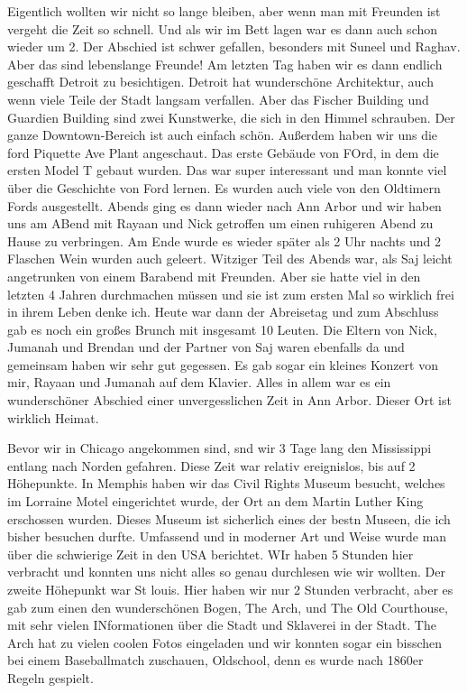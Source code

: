 \documentclass[11pt]{book}
\begin{document}
Eigentlich wollten wir nicht so lange bleiben, aber wenn man mit Freunden ist vergeht die Zeit so schnell. Und als wir im Bett lagen war es dann auch schon wieder 
um 2. Der Abschied ist schwer gefallen, besonders mit Suneel und Raghav. Aber das sind lebenslange Freunde! 
Am letzten Tag haben wir es dann endlich geschafft Detroit zu besichtigen. Detroit hat wunderschöne Architektur, auch wenn viele Teile der Stadt langsam verfallen. 
Aber das Fischer Building und Guardien Building sind zwei Kunstwerke, die sich in den Himmel schrauben. Der ganze Downtown-Bereich ist auch einfach schön. Außerdem 
haben wir uns die ford Piquette Ave Plant angeschaut. Das erste Gebäude von FOrd, in dem die ersten Model T gebaut wurden. Das war super interessant und man 
konnte viel über die Geschichte von Ford lernen. Es wurden auch viele von den Oldtimern Fords ausgestellt. Abends ging es dann wieder nach Ann Arbor und wir haben 
uns am ABend mit Rayaan und Nick getroffen um einen ruhigeren Abend zu Hause zu verbringen. Am Ende wurde es wieder später als 2 Uhr nachts und 2 Flaschen Wein 
wurden auch geleert. Witziger Teil des Abends war, als Saj leicht angetrunken von einem Barabend mit Freunden. Aber sie hatte viel in den letzten 4 Jahren durchmachen 
müssen und sie ist zum ersten Mal so wirklich frei in ihrem Leben denke ich. 
Heute war dann der Abreisetag und zum Abschluss gab es noch ein großes Brunch mit insgesamt 10 Leuten. Die Eltern von Nick, Jumanah und Brendan und der 
Partner von Saj waren ebenfalls da und gemeinsam haben wir sehr gut gegessen. Es gab sogar ein kleines Konzert von mir, Rayaan und Jumanah auf dem Klavier. 
Alles in allem war es ein wunderschöner Abschied einer unvergesslichen Zeit in Ann Arbor. Dieser Ort ist wirklich Heimat.

Bevor wir in Chicago angekommen sind, snd wir 3 Tage lang den Mississippi entlang nach Norden gefahren. Diese Zeit war relativ ereignislos, bis auf 2 Höhepunkte. 
In Memphis haben wir das Civil Rights Museum besucht, welches im Lorraine Motel eingerichtet wurde, der Ort an dem Martin Luther King erschossen wurden. Dieses Museum 
ist sicherlich eines der bestn Museen, die ich bisher besuchen durfte. Umfassend und in moderner Art und Weise wurde man über die schwierige Zeit in den 
USA berichtet. WIr haben 5 Stunden hier verbracht und konnten uns nicht alles so genau durchlesen wie wir wollten. Der zweite Höhepunkt war St louis. Hier haben 
wir nur 2 Stunden verbracht, aber es gab zum einen den wunderschönen Bogen, The Arch, und The Old Courthouse, mit sehr vielen INformationen über die 
Stadt und Sklaverei in der Stadt. The Arch hat zu vielen coolen Fotos eingeladen und wir konnten sogar ein bisschen bei einem Baseballmatch zuschauen, Oldschool, 
denn es wurde nach 1860er Regeln gespielt.
\end{document}
